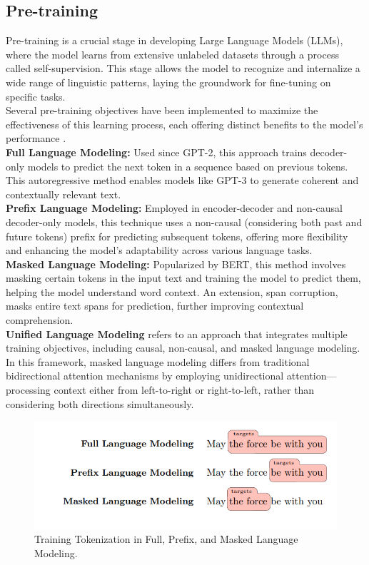 \subsection{Pre-training}
Pre-training is a crucial stage in developing Large Language Models (LLMs), where the model learns from extensive unlabeled datasets through a process called self-supervision. This stage allows the model to recognize and internalize a wide range of linguistic patterns, laying the groundwork for fine-tuning on specific tasks.\\
Several pre-training objectives have been implemented to maximize the effectiveness of this learning process, each offering distinct benefits to the model's performance .\\
\textbf{Full Language Modeling:} Used since GPT-2, this approach trains decoder-only models to predict the next token in a sequence based on previous tokens. This autoregressive method enables models like GPT-3 to generate coherent and contextually relevant text.\\
\textbf{Prefix Language Modeling: }Employed in encoder-decoder and non-causal decoder-only models, this technique uses a non-causal (considering both past and future tokens) prefix for predicting subsequent tokens, offering more flexibility and enhancing the model's adaptability across various language tasks.\\
\textbf{Masked Language Modeling: }Popularized by BERT, this method involves masking certain tokens in the input text and training the model to predict them, helping the model understand word context. An extension, span corruption, masks entire text spans for prediction, further improving contextual comprehension\cite{wang2023language}.\\
\textbf{Unified Language Modeling} refers to an approach that integrates multiple training objectives, including causal, non-causal, and masked language modeling. In this framework, masked language modeling differs from traditional bidirectional attention mechanisms by employing unidirectional attention—processing context either from left-to-right or right-to-left, rather than considering both directions simultaneously\cite{dong2019unified}.
\begin{figure}[h]
	\centering
	\includegraphics[width=0.6\linewidth]{Figures/pretraining.png}
	\caption{Training Tokenization in Full, Prefix, and Masked Language Modeling.}
\end{figure}
